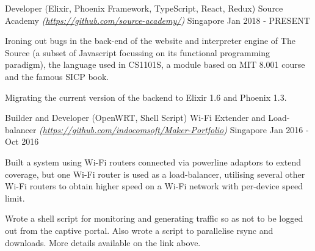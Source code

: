 \begin{cventries}
\cventry
    {Developer (Elixir, Phoenix Framework, TypeScript, React, Redux)} %
    {Source Academy \textmd{\em\tiny(\url{https://github.com/source-academy/})}} %
    {Singapore} %
    {Jan 2018 - PRESENT} %
    {
      \begin{cvitems} %
      	\item {Ironing out bugs in the back-end of the website and interpreter engine of The Source (a subset of Javascript focussing on its functional programming paradigm), the language used in CS1101S, a module based on MIT 8.001 course and the famous SICP book.}
      	\item {Migrating the current version of the backend to Elixir 1.6 and Phoenix 1.3.}
      \end{cvitems}
    }

\cventry
    {Builder and Developer (OpenWRT, Shell Script)} %
    {Wi-Fi Extender and Load-balancer \textmd{\em\tiny (\url{https://github.com/indocomsoft/Maker-Portfolio})}} %
    {Singapore} %
    {Jan 2016 - Oct 2016} %
    {
      \begin{cvitems} %
      	\item {Built a system using Wi-Fi routers connected via powerline adaptors to extend coverage, but one Wi-Fi router is used as a load-balancer, utilising several other Wi-Fi routers to obtain higher speed on a Wi-Fi network with per-device speed limit.}
      	\item {Wrote a shell script for monitoring and generating traffic so as not to be logged out from the captive portal. Also wrote a script to parallelise rsync and downloads. More details available on the link above.}
      \end{cvitems}
    }
\end{cventries}
